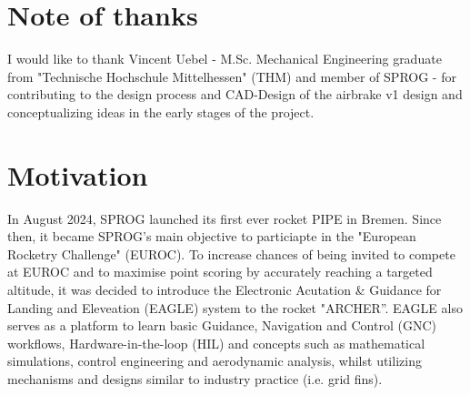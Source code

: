 \documentclass[fontsize=11pt,%
twoside,%
BCOR          = 8mm, %
DIV           = 11,  %
titlepage     = off,%
index=totoc,%
xcolor        = pdftex,%
dvipsnames,%
bibliography  = totoc,%
bibliography = numbered, %
listof        = notnumbered]{scrreprt}
\begin{document}
\section{Note of thanks}
I would like to thank Vincent Uebel - M.Sc. Mechanical Engineering graduate from "Technische Hochschule Mittelhessen" (THM) and member of SPROG - for contributing to the design process and CAD-Design of the airbrake v1 design and conceptualizing ideas in the early stages of the project.

\section{Motivation}
In August 2024, SPROG launched its first ever rocket PIPE in Bremen. Since then, it became SPROG's main objective to particiapte in the "European Rocketry Challenge" (EUROC). To increase chances of being invited to compete at EUROC and to maximise point scoring by accurately reaching a targeted altitude, it was decided to introduce the Electronic Acutation \& Guidance for Landing and Eleveation (EAGLE) system to the rocket "ARCHER''. EAGLE also serves as a platform to learn basic Guidance, Navigation and Control (GNC) workflows, Hardware-in-the-loop (HIL) and concepts such as mathematical simulations, control engineering and aerodynamic analysis, whilst utilizing mechanisms and designs similar to industry practice (i.e. grid fins). \\
\end{document}
